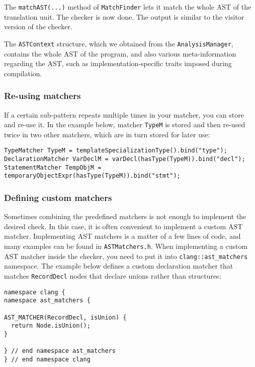 \documentclass[a4paper,12pt]{article}
\newenvironment{nobr}{\begin{minipage}{\textwidth}\setlength\parskip{1em}
}{\end{minipage}\ignorespacesafterend}
\begin{document}
The \lstinline|matchAST(...)| method of \lstinline|MatchFinder| lets it match the whole AST of the translation unit. The check\-er is now done. The output is similar to the visitor version of the checker.

The \lstinline|ASTContext| structure, which we obtained from the \lstinline|AnalysisManager|, contains the whole AST of the program, and also various meta-information regarding the AST, such as implementation-specific traits imposed during compilation.

\begin{nobr}
\subsubsection{Re-using matchers}

If a certain sub-pattern repeats multiple times in your matcher, you can store and re-use it. In the example below, matcher \lstinline|TypeM| is stored and then re-used twice in two other matchers, which are in turn stored for later use:

\begin{lstlisting}[style=cplusplus]
TypeMatcher TypeM = templateSpecializationType().bind("type");
DeclarationMatcher VarDeclM = varDecl(hasType(TypeM)).bind("decl");
StatementMatcher TempObjM = temporaryObjectExpr(hasType(TypeM)).bind("stmt");
\end{lstlisting}
\end{nobr}



\begin{nobr}
\subsubsection{Defining custom matchers}

Sometimes combining the predefined matchers is not enough to implement the desired check. In this case, it is often convenient to implement a custom AST matcher. Implementing AST matchers is a matter of a few lines of code, and many examples can be found in \lstinline|ASTMatchers.h|. When implementing a custom AST matcher inside the checker, you need to put it into \lstinline|clang::ast_matchers| namespace. The example below defines a custom declaration matcher that matches \lstinline|RecordDecl| nodes that declare unions rather than structures:

\begin{lstlisting}[style=cplusplus]
namespace clang {
namespace ast_matchers {

AST_MATCHER(RecordDecl, isUnion) {
  return Node.isUnion();
}

} // end namespace ast_matchers
} // end namespace clang
\end{lstlisting}
\end{nobr}
\end{document}
